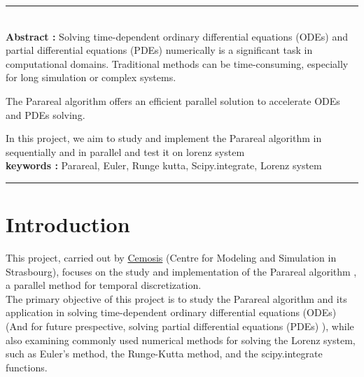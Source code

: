 \documentclass[a4paper,12pt,french]{article}
\begin{document}
\newpage
\thispagestyle{empty}

\vspace*{\fill}
\noindent\rule[2pt]{\textwidth}{0.5pt}\\
{\textbf{Abstract :}}
Solving time-dependent ordinary differential equations (ODEs) and partial differential equations (PDEs) numerically is 
    a significant task in computational domains. Traditional methods can be time-consuming, especially for long simulation or complex systems.
    
    The Parareal algorithm offers an efficient parallel solution to accelerate ODEs and PDEs solving.
    
    In this project, we aim to study and implement the Parareal algorithm in sequentially and in parallel and test it on lorenz system\\

{\noindent\textbf{keywords :}}
Parareal, Euler, Runge kutta, Scipy.integrate, Lorenz system
\\
\noindent\rule[2pt]{\textwidth}{0.5pt}

\vspace*{\fill}
\newpage


\thispagestyle{empty}
\tableofcontents

\newpage
\section{Introduction}
This project, carried out by \href{http://cemosis.fr}{Cemosis} \cite{cemosis} (Centre for Modeling and Simulation in Strasbourg), focuses on the study and implementation of the Parareal algorithm \cite{lions2001resolution}, a parallel method for temporal discretization.\\

The primary objective of this project is to study the Parareal algorithm and its application in solving time-dependent ordinary differential equations (ODEs) (And for future prespective, solving partial differential equations (PDEs) ), while also examining commonly used numerical methods for solving the Lorenz system, such as Euler's method, the Runge-Kutta method, and the scipy.integrate functions. \\
\end{document}
